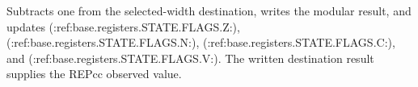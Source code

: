Subtracts one from the selected-width destination, writes the modular result, and updates (:ref:base.registers.STATE.FLAGS.Z:), (:ref:base.registers.STATE.FLAGS.N:), (:ref:base.registers.STATE.FLAGS.C:), and (:ref:base.registers.STATE.FLAGS.V:). The written destination result supplies the REPcc observed value.
